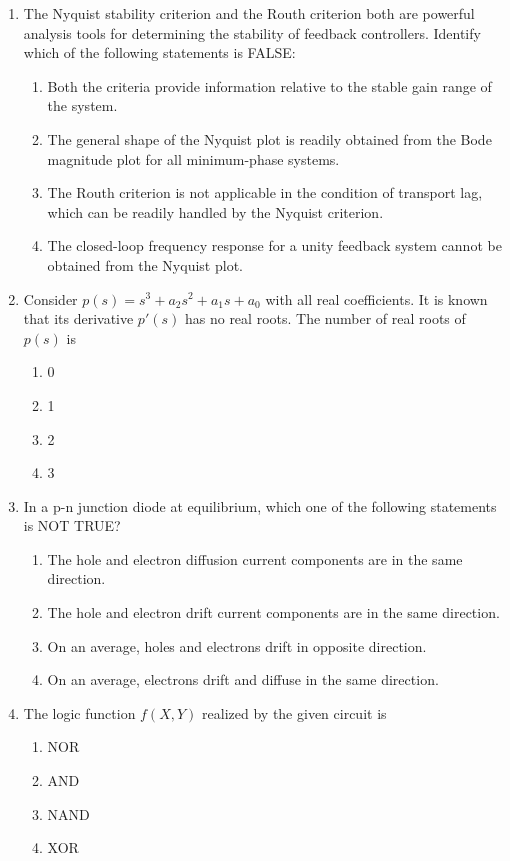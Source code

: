 \documentclass{article}
\begin{document}
\begin{enumerate}
\item The Nyquist stability criterion and the Routh criterion both are powerful analysis tools for determining the stability of feedback controllers. Identify which of the following statements is FALSE:
\begin{enumerate}
\item Both the criteria provide information relative to the stable gain range of the system.
\item The general shape of the Nyquist plot is readily obtained from the Bode magnitude plot for all minimum-phase systems.
\item The Routh criterion is not applicable in the condition of transport lag, which can be readily handled by the Nyquist criterion.
\item The closed-loop frequency response for a unity feedback system cannot be obtained from the Nyquist plot.
\end{enumerate}

\item Consider $p(s) = s^3 + a_2 s^2 + a_1 s + a_0$ with all real coefficients. It is known that its derivative $p'(s)$ has no real roots. The number of real roots of $p(s)$ is
\begin{multicols}{4}
\begin{enumerate}
\item 0
\item 1
\item 2
\item 3
\end{enumerate}
\end{multicols}

\item In a p-n junction diode at equilibrium, which one of the following statements is NOT TRUE?
\begin{enumerate}
\item The hole and electron diffusion current components are in the same direction.
\item The hole and electron drift current components are in the same direction.
\item On an average, holes and electrons drift in opposite direction.
\item On an average, electrons drift and diffuse in the same direction.
\end{enumerate}

\item The logic function $f(X, Y)$ realized by the given circuit is
\begin{figure}[H]
    \centering
    
    \caption{}
    \label{fig:q18}
\end{figure}
\begin{multicols}{4}
\begin{enumerate}
\item NOR
\item AND
\item NAND
\item XOR
\end{enumerate}
\end{multicols}


\end{enumerate}
\end{document}
